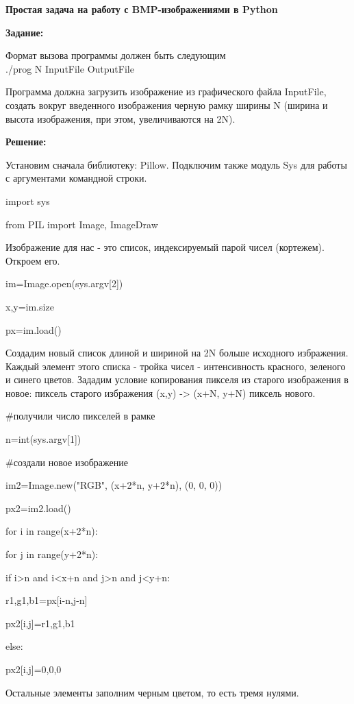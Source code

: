 \documentclass{article}
\newcommand\tab[1][1cm]{\hspace*{#1}}
\begin{document}
\begin{center}
\Large\bf Простая задача на работу с BMP-изображениями в Python
\end{center}

{\large\bf Задание:}

Формат вызова программы должен быть следующим\\
./prog N InputFile OutputFile

Программа должна загрузить изображение из графического файла InputFile, создать вокруг введенного изображения черную рамку ширины N (ширина и высота изображения, при этом, увеличиваются на 2N).

{\large\bf Решение:}

Установим сначала библиотеку: Pillow. Подключим также модуль Sys для работы с аргументами командной строки.

{
import sys

from PIL import Image, ImageDraw}

Изображение для нас - это список, индексируемый парой чисел (кортежем). Откроем его.

{
im=Image.open(sys.argv[2])

x,y=im.size

px=im.load()}

Создадим новый список длиной и шириной на 2N больше исходного избражения. Каждый элемент этого списка - тройка чисел - интенсивность красного, зеленого и синего цветов.
Зададим условие копирования пикселя из старого изображения в новое: пиксель старого избражения (x,y) -> (x+N, y+N) пиксель нового.

{
\#получили число пикселей в рамке

n=int(sys.argv[1])

\#создали новое изображение

im2=Image.new("RGB", (x+2*n, y+2*n), (0, 0, 0))

px2=im2.load()

for i in range(x+2*n):

\tab[1cm]	for j in range(y+2*n):

\tab[2cm]		if i>n and i<x+n and j>n and j<y+n:

\tab[3cm]			r1,g1,b1=px[i-n,j-n]

\tab[3cm]			px2[i,j]=r1,g1,b1

\tab[2cm]		else:

\tab[3cm]			px2[i,j]=0,0,0}

Остальные элементы заполним черным цветом, то есть тремя нулями.
\end{document}
